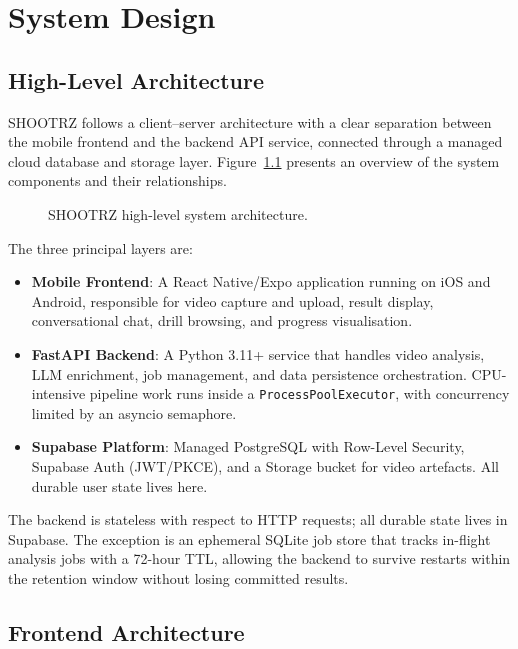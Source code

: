 \chapter{System Design}
\label{chap:design}

\section{High-Level Architecture}
\label{sec:architecture}

SHOOTRZ follows a client--server architecture with a clear separation between the mobile frontend and the backend API service, connected through a managed cloud database and storage layer. Figure~\ref{fig:architecture} presents an overview of the system components and their relationships.

\begin{figure}[H]
  \centering
  \caption{SHOOTRZ high-level system architecture.}
  \label{fig:architecture}
\end{figure}

The three principal layers are:

\begin{itemize}
  \item \textbf{Mobile Frontend}: A React Native/Expo application running on iOS and Android, responsible for video capture and upload, result display, conversational chat, drill browsing, and progress visualisation.
  \item \textbf{FastAPI Backend}: A Python 3.11+ service that handles video analysis, LLM enrichment, job management, and data persistence orchestration. CPU-intensive pipeline work runs inside a \lstinline|ProcessPoolExecutor|, with concurrency limited by an asyncio semaphore.
  \item \textbf{Supabase Platform}: Managed PostgreSQL with Row-Level Security, Supabase Auth (JWT/PKCE), and a Storage bucket for video artefacts. All durable user state lives here.
\end{itemize}

The backend is stateless with respect to HTTP requests; all durable state lives in Supabase. The exception is an ephemeral SQLite job store that tracks in-flight analysis jobs with a 72-hour TTL, allowing the backend to survive restarts within the retention window without losing committed results.

\section{Frontend Architecture}
\label{sec:frontend_arch}

